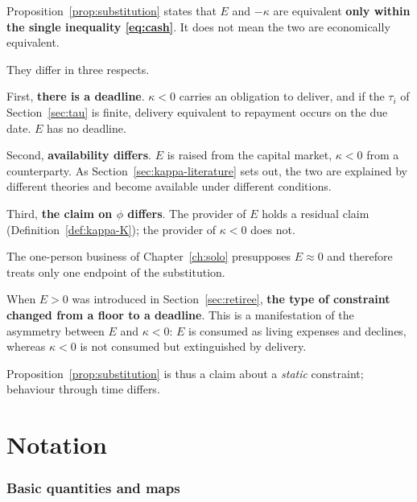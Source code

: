 \begin{remark}
\label{rem:substitution-limit}
Proposition~\ref{prop:substitution} states that $E$ and $-\kappa$ are equivalent
\textbf{only within the single inequality \eqref{eq:cash}}. It does not mean the two are
economically equivalent.

They differ in three respects.

First, \textbf{there is a deadline}. $\kappa<0$ carries an obligation to deliver, and if the
$\tau_i$ of Section~\ref{sec:tau} is finite, delivery equivalent to repayment occurs on the due
date. $E$ has no deadline.

Second, \textbf{availability differs}. $E$ is raised from the capital market, $\kappa<0$ from a
counterparty. As Section~\ref{sec:kappa-literature} sets out, the two are explained by different
theories and become available under different conditions.

Third, \textbf{the claim on $\phi$ differs}. The provider of $E$ holds a residual claim
(Definition~\ref{def:kappa-K}); the provider of $\kappa<0$ does not.
\end{remark}

\begin{remark}
\label{rem:substitution-boundary}
The one-person business of Chapter~\ref{ch:solo} presupposes $E\approx 0$ and therefore treats
only one endpoint of the substitution.

When $E>0$ was introduced in Section~\ref{sec:retiree}, \textbf{the type of constraint changed
from a floor to a deadline}. This is a manifestation of the asymmetry between $E$ and $\kappa<0$:
$E$ is consumed as living expenses and declines, whereas $\kappa<0$ is not consumed but
extinguished by delivery.

Proposition~\ref{prop:substitution} is thus a claim about a \emph{static} constraint; behaviour
through time differs.
\end{remark}

\chapter{Notation}
\label{app:notation}

\subsection*{Basic quantities and maps}


